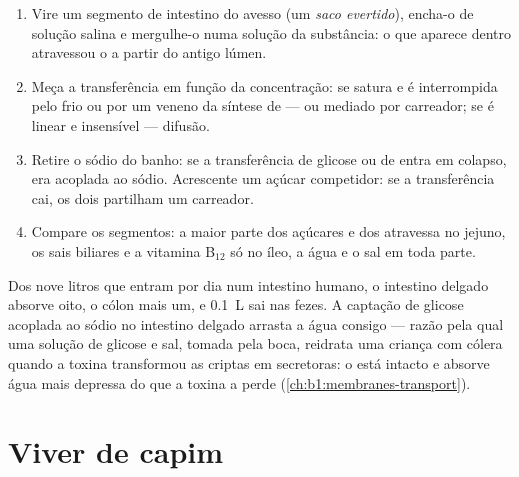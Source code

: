 \begin{method}\label{met:b1:digestion-absorption:everted}
\begin{enumerate}
  \item Vire um segmento de intestino do avesso (um \emph{saco
        evertido}), encha-o de solução salina e mergulhe-o numa
        solução da substância: o que aparece dentro atravessou o
         a partir do antigo lúmen.
  \item Meça a transferência em função da concentração: se satura e é
        interrompida pelo frio ou por um veneno da síntese de  ---
         ou mediado por carreador; se é linear e
        insensível --- difusão.
  \item Retire o sódio do banho: se a transferência de glicose ou de
         entra em colapso, era acoplada ao sódio.
        Acrescente um açúcar competidor: se a transferência cai, os
        dois partilham um carreador.
  \item Compare os segmentos: a maior parte dos açúcares e dos
         atravessa no jejuno, os sais biliares e a vitamina
        B$_{12}$ só no íleo, a água e o sal em toda parte.
\end{enumerate}
\end{method}

\begin{example}\label{ex:b1:digestion-absorption:water}
Dos nove litros que entram por dia num intestino humano, o intestino
delgado absorve oito, o cólon mais um, e \qty{0.1}{L} sai nas fezes. A
captação de glicose acoplada ao sódio no intestino delgado arrasta a
água consigo --- razão pela qual uma solução de glicose e sal, tomada
pela boca, reidrata uma criança com cólera quando a toxina transformou
as criptas em secretoras: o  está intacto e absorve água
mais depressa do que a toxina a perde
(\cref{ch:b1:membranes-transport}).
\end{example}

\section{Viver de capim}

